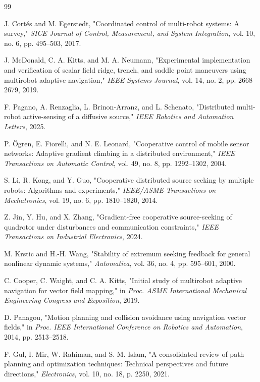 \documentclass[lettersize,journal]{IEEEtran}
\begin{document}
\begin{thebibliography}{99}

 J. Cortés and M. Egerstedt, "Coordinated control of multi-robot systems: A survey," \textit{SICE Journal of Control, Measurement, and System Integration}, vol. 10, no. 6, pp. 495--503, 2017.

 J. McDonald, C. A. Kitts, and M. A. Neumann, "Experimental implementation and verification of scalar field ridge, trench, and saddle point maneuvers using multirobot adaptive navigation," \textit{IEEE Systems Journal}, vol. 14, no. 2, pp. 2668--2679, 2019.

 F. Pagano, A. Renzaglia, L. Brinon-Arranz, and L. Schenato, "Distributed multi-robot active-sensing of a diffusive source," \textit{IEEE Robotics and Automation Letters}, 2025.

 P. Ögren, E. Fiorelli, and N. E. Leonard, "Cooperative control of mobile sensor networks: Adaptive gradient climbing in a distributed environment," \textit{IEEE Transactions on Automatic Control}, vol. 49, no. 8, pp. 1292--1302, 2004.

 S. Li, R. Kong, and Y. Guo, "Cooperative distributed source seeking by multiple robots: Algorithms and experiments," \textit{IEEE/ASME Transactions on Mechatronics}, vol. 19, no. 6, pp. 1810--1820, 2014.

 Z. Jin, Y. Hu, and X. Zhang, "Gradient-free cooperative source-seeking of quadrotor under disturbances and communication constraints," \textit{IEEE Transactions on Industrial Electronics}, 2024.

 M. Krstic and H.-H. Wang, "Stability of extremum seeking feedback for general nonlinear dynamic systems," \textit{Automatica}, vol. 36, no. 4, pp. 595--601, 2000.

 C. Cooper, C. Waight, and C. A. Kitts, "Initial study of multirobot adaptive navigation for vector field mapping," in \textit{Proc. ASME International Mechanical Engineering Congress and Exposition}, 2019.

 D. Panagou, "Motion planning and collision avoidance using navigation vector fields," in \textit{Proc. IEEE International Conference on Robotics and Automation}, 2014, pp. 2513--2518.

 F. Gul, I. Mir, W. Rahiman, and S. M. Islam, "A consolidated review of path planning and optimization techniques: Technical perspectives and future directions," \textit{Electronics}, vol. 10, no. 18, p. 2250, 2021.


\end{thebibliography}
\end{document}
